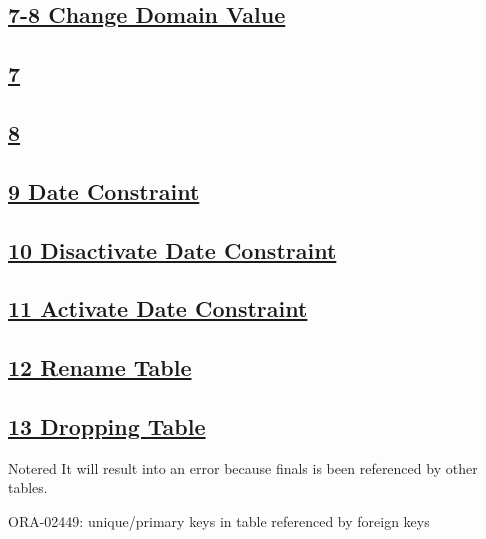 \subsection*{\underline{7-8 Change Domain Value}}
\subsection*{\underline{7}}

\vspace{0.15cm}

\subsection*{\underline{8}}


\vspace{0.35cm}

\subsection*{\underline{9 Date Constraint}}

\vspace{0.35cm}

\subsection*{\underline{10 Disactivate Date Constraint}}

\vspace{0.35cm}

\subsection*{\underline{11 Activate Date Constraint}}

\vspace{0.35cm}

\subsection*{\underline{12 Rename Table}}

\vspace{0.35cm}

\subsection*{\underline{13 Dropping Table}}

\vspace{0.15cm}

\begin{prettyBox}{Note}{red}
It will result into an error because finals is been referenced by other tables.
\begin{center}
    ORA-02449: unique/primary keys in table referenced by foreign keys
\end{center}   
\end{prettyBox}




